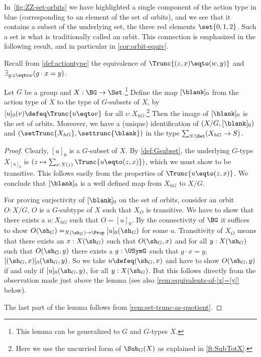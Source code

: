 In~\cref{fig:ZZ-set-orbits} we have highlighted a single component of
the action type in blue (\ie corresponding to an element of the set of orbits),
and we see that it contains a subset of the underlying set,
the three red elements $\set{0,1,2}$.
Such a set is what is traditionally called an orbit.
This connection is emphasized in the following result,
and in particular in \cref{cor:orbit-equiv}.

Recall from \cref{def:actiontype} the equivalence of
$\Trunc{(z,x)\eqto(w,y)}$ and $\exists_{g:z\eqto w}(g\cdot x = y)$.

\begin{lemma}\label{lem:[]0-surj-on-orbits}
  Let $G$ be a group and $X : \BG\to\Set$.\footnote{%
  This lemma can be generalized to \inftygps $G$ and $G$-types $X$.}
  Define the map $[\blank]_0$ from the action type of $X$ to the type of
  $G$-subsets of $X$, by $[u]_0(v) \defeq \Trunc{u\eqto v}$
  for all $v:X_{hG}$.\footnote{%
  Here we use the uncurried form of $\Sub_G(X)$ as
  explained in \cref{ft:SubTotX}.}
  Then the image of $[\blank]_0$ is the set of orbits.
  Moreover, we have a (unique) identification of
  $(X/G,[\blank]_0)$ and $(\setTrunc{X_{hG}},\settrunc{\blank})$
  in the type $\sum_{S:\Set}(X_{hG}\to S)$.
\end{lemma}
\begin{proof}
  Clearly, $[u]_0$ is a $G$-subset of $X$. 
  By \cref{def:Gsubset}, the underlying $G$-type $X_{[u]_0}$ is
  $(z\mapsto \sum_{x:X(z)}\Trunc{u\eqto(z,x)})$, which we
  must show to be transitive. This follows easily from the properties
  of $\Trunc{u\eqto(z,x)}$. We conclude that
  $[\blank]_0$ is a well defined map from $X_{hG}$ to $X/G$.
  
  For proving surjectivity of $[\blank]_0$ on the set of orbits, 
  consider an orbit $O:X/G$, \ie
  $O$ is a $G$-subtype of $X$ such that $X_O$ is transitive. 
  We have to show that there exists a $u:X_{hG}$ such that $O=[u]_0$.
  By the connectivity of $\BG$ it suffices to show 
  $O(\sh_G)=_{X(\sh_G)\to\Prop}[u]_0(\sh_G)$ for some $u$.
  Transitivity of $X_O$ means that there exists an $x:X(\sh_G)$
  such that $O(\sh_G,x)$ and for all $y:X(\sh_G)$ such that
  $O(\sh_G,y)$ there
  exists a $g:\USymG$ such that $g\cdot x = y$, \ie $[(\sh_G,x)]_0(\sh_G,y)$.
  So we take $u\defeq(\sh_G,x)$ and have to show $O(\sh_G,y)$ if and only if
  $[u]_0(\sh_G,y)$, for all $y:X(\sh_G)$. But this follows directly from
  the observation made just above the lemma
  (see also \cref{rem:equivalents-of-[x]=[y]} below).
  
  The last part of the lemma follows from \cref{rem:set-trunc-as-quotient}. 
\end{proof}

